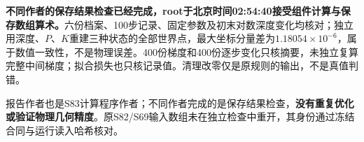 \textbf{不同作者的保存结果检查已经完成，root于北京时间02:54:40接受组件计算与保存数组算术。}六份档案、100步记录、固定参数及初末对数深度变化均核对；独立用深度、$P$、$K$重建三种状态的全部世界点，最大坐标分量差为$1.18054\times10^{-6}$，属于数值一致性，不是物理误差。400份梯度和400份逐步变化只核摘要，未独立复算完整中间梯度；拟合损失也只核记录值。清理改零仅是原规则的输出，不是真值判错。

报告作者也是S83计算程序作者；不同作者完成的是保存结果检查，\textbf{没有重复优化或验证物理几何精度}。原S82/S69输入数组未在独立检查中重开，其身份通过冻结合同与运行读入哈希核对。
